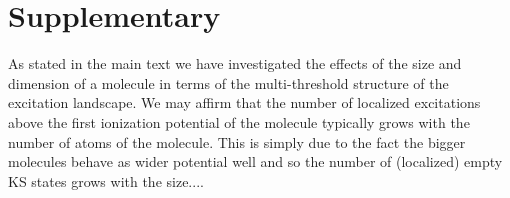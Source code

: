 \documentclass[11pt,a4paper]{article}
\begin{document}


\section*{Supplementary}

As stated in the main text we have investigated the effects of the size and dimension of a molecule in terms of the multi-threshold
structure of the excitation landscape. 
We may affirm that the number of localized excitations above the first ionization potential of the molecule typically grows with the
number of atoms of the molecule. This is simply due to the fact the bigger molecules behave as wider potential well and so the number of
(localized) empty KS states grows with the size....   
\end{document}
